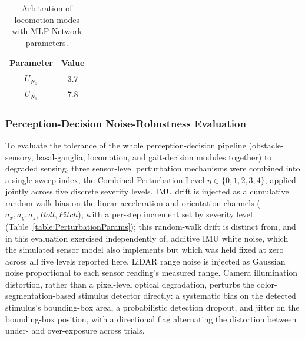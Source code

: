 
\begin{table}%
\centering
\caption{Arbitration of locomotion modes with MLP Network parameters.}
\begin{tabular}{|c|c|}
\hline
\textbf{Parameter} & \textbf{Value} \\ \hline

$U_{N_{0}}$ & 3.7 \\ \hline
$U_{N_{1}}$ & 7.8 \\ \hline

\end{tabular}
\label{table:Locom_MLP}
\end{table}

\subsubsection{Perception-Decision Noise-Robustness Evaluation}
\label{ssec:NoiseRobustnessEval}

To evaluate the tolerance of the whole perception-decision pipeline (obstacle-sensory, basal-ganglia, locomotion, and gait-decision modules together) to degraded sensing, three sensor-level perturbation mechanisms  were combined into a single sweep index, the Combined Perturbation Level $\eta \in \{0,1,2,3,4\}$, applied jointly across five discrete severity levels. IMU drift is injected as a cumulative random-walk bias on the linear-acceleration and orientation channels ($a_x,a_y,a_z,Roll,Pitch$), with a per-step increment set by severity level (Table~\ref{table:PerturbationParams}); this random-walk drift is distinct from, and in this evaluation exercised independently of, additive IMU white noise, which the simulated sensor model also implements but which was held fixed at zero across all five levels reported here. LiDAR range noise is injected as Gaussian noise proportional to each sensor reading's measured range. Camera illumination distortion, rather than a pixel-level optical degradation, perturbs the color-segmentation-based stimulus detector directly: a systematic bias on the detected stimulus's bounding-box area, a probabilistic detection dropout, and jitter on the bounding-box position, with a directional flag alternating the distortion between under- and over-exposure across trials.

